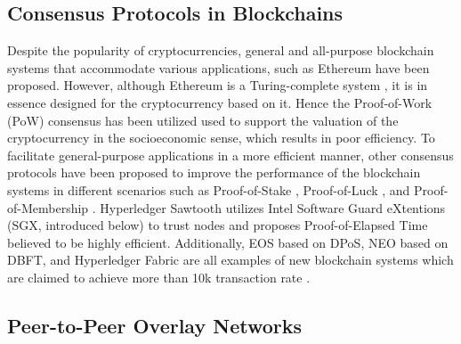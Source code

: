 \subsection{Consensus Protocols in Blockchains}

Despite the popularity of cryptocurrencies, general and all-purpose blockchain systems that accommodate various applications, such as Ethereum \cite{wood2014ethereum} have been proposed. However, although Ethereum is a Turing-complete system \cite{wood2014ethereum}, it is in essence designed for the cryptocurrency based on it. Hence the Proof-of-Work (PoW) consensus has been utilized used to support the valuation of the cryptocurrency in the socioeconomic sense, which results in poor efficiency. To facilitate general-purpose applications in a more efficient manner, other consensus protocols have been proposed to improve the performance of the blockchain systems in different scenarios such as Proof-of-Stake \cite{kiayias2017ouroboros}, Proof-of-Luck \cite{milutinovic2016proof}, and Proof-of-Membership \cite{kogias2016enhancing}. Hyperledger Sawtooth \cite{sawtooth} utilizes Intel Software Guard eXtentions (SGX, introduced below) to trust nodes and proposes Proof-of-Elapsed Time believed to be highly efficient. Additionally, EOS \cite{eosio} based on DPoS, NEO \cite{hoxha2018hashgraph} based on DBFT, and Hyperledger Fabric \cite{cachin2016architecture} are all examples of new blockchain systems which are claimed to achieve more than 10k transaction rate \cite{bach2018comparative}.

\subsection{Peer-to-Peer Overlay Networks}


